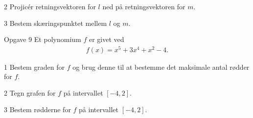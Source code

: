 \begin{delopgave}{}{2}
	Projicér retningsvektoren for $l$ ned på retningsvektoren for $m$.  
\end{delopgave}
\begin{delopgave}{}{3}
	Bestem skæringspunktet mellem $l$ og $m$.
\end{delopgave}
\begin{opgavetekst}{Opgave 9}
	Et polynomium $f$ er givet ved
	\begin{align*}
		f(x) = x^5+3x^4+x^2-4.
	\end{align*}
\end{opgavetekst}
\begin{delopgave}{}{1}
	Bestem graden for $f$ og brug denne til at bestemme det maksimale antal rødder for $f$. 
\end{delopgave}
\begin{delopgave}{}{2}
	Tegn grafen for $f$ på intervallet $[-4,2]$.
\end{delopgave}
\begin{delopgave}{}{3}
	Bestem rødderne for $f$ på intervallet $[-4,2]$.
\end{delopgave}
